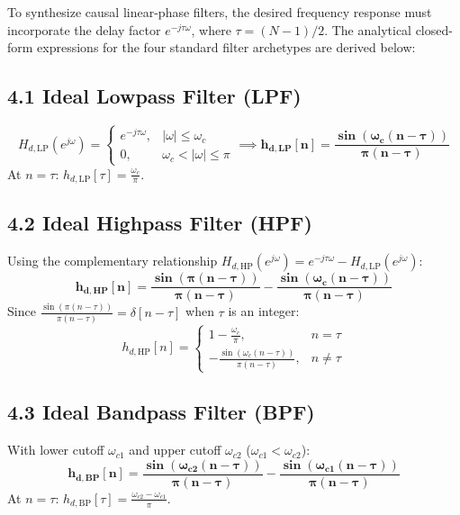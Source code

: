 \documentclass[11pt,a4paper]{article}
\begin{document}
To synthesize causal linear-phase filters, the desired frequency response must incorporate the delay factor $e^{-j\tau \omega}$, where $\tau = (N-1)/2$. The analytical closed-form expressions for the four standard filter archetypes are derived below:

\subsection{4.1 Ideal Lowpass Filter (LPF)}
\begin{equation}
H_{d,\text{LP}}(e^{j\omega}) = \begin{cases} e^{-j\tau \omega}, & |\omega| \le \omega_c \\ 0, & \omega_c < |\omega| \le \pi \end{cases} \implies \mathbf{h_{d,\text{LP}}[n] = \frac{\sin(\omega_c(n - \tau))}{\pi(n - \tau)}}
\label{eq:hd_lpf}
\end{equation}
At $n = \tau$: $h_{d,\text{LP}}[\tau] = \frac{\omega_c}{\pi}$.

\subsection{4.2 Ideal Highpass Filter (HPF)}
Using the complementary relationship $H_{d,\text{HP}}(e^{j\omega}) = e^{-j\tau\omega} - H_{d,\text{LP}}(e^{j\omega})$:
\begin{equation}
\mathbf{h_{d,\text{HP}}[n] = \frac{\sin(\pi(n - \tau))}{\pi(n - \tau)} - \frac{\sin(\omega_c(n - \tau))}{\pi(n - \tau)}}
\label{eq:hd_hpf}
\end{equation}
Since $\frac{\sin(\pi(n-\tau))}{\pi(n-\tau)} = \delta[n - \tau]$ when $\tau$ is an integer:
\begin{equation}
h_{d,\text{HP}}[n] = \begin{cases} 1 - \frac{\omega_c}{\pi}, & n = \tau \\ -\frac{\sin(\omega_c(n - \tau))}{\pi(n - \tau)}, & n \ne \tau \end{cases}
\end{equation}

\subsection{4.3 Ideal Bandpass Filter (BPF)}
With lower cutoff $\omega_{c1}$ and upper cutoff $\omega_{c2}$ ($\omega_{c1} < \omega_{c2}$):
\begin{equation}
\mathbf{h_{d,\text{BP}}[n] = \frac{\sin(\omega_{c2}(n - \tau))}{\pi(n - \tau)} - \frac{\sin(\omega_{c1}(n - \tau))}{\pi(n - \tau)}}
\label{eq:hd_bpf}
\end{equation}
At $n = \tau$: $h_{d,\text{BP}}[\tau] = \frac{\omega_{c2} - \omega_{c1}}{\pi}$.
\end{document}
